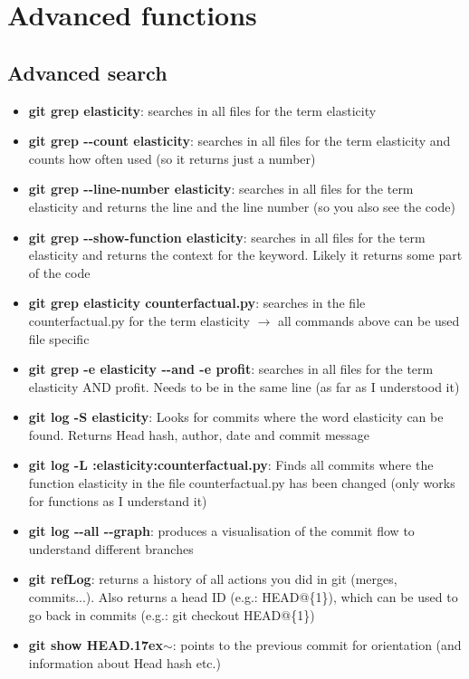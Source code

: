 \documentclass[12pt]{article}
\begin{document}
\section{Advanced functions}
\subsection{Advanced search}
\begin {itemize}
\item \textbf{git grep elasticity}: searches in all files for the term elasticity
\item \textbf{git grep \textrm{-}\textrm{-}count elasticity}: searches in all files for the term elasticity and counts how often used (so it returns just a number)
\item \textbf{git grep \textrm{-}\textrm{-}line-number elasticity}: searches in all files for the term elasticity and returns the line and the line number (so you also see the code)
\item \textbf{git grep \textrm{-}\textrm{-}show-function elasticity}: searches in all files for the term elasticity and returns the context for the keyword. Likely it returns some part of the code
\item \textbf{git grep elasticity counterfactual.py}: searches in the file counterfactual.py for the term elasticity $\rightarrow$ all commands above can be used file specific
\item \textbf{git grep -e elasticity \textrm{-}\textrm{-}and -e profit}: searches in all files for the term elasticity AND profit. Needs to be in the same line (as far as I understood it)
\item \textbf{git log -S elasticity}: Looks for commits where the word elasticity can be found. Returns  Head hash, author, date and commit message
\item \textbf{git log -L :elasticity:counterfactual.py}: Finds all commits where the function elasticity in the file counterfactual.py has been changed (only works for functions as I understand it)
\item \textbf{git log \textrm{-}\textrm{-}all \textrm{-}\textrm{-}graph}: produces a visualisation of the commit flow to understand different branches 
\item \textbf{git refLog}: returns a history of all actions you did in git (merges, commits...). Also returns a head ID (e.g.: HEAD@\{1\}), which can be used to go back in commits (e.g.: git checkout HEAD@\{1\})
\item \textbf{git show HEAD{\raise.17ex\hbox{$\scriptstyle\mathtt{\sim}$}}}: points to the previous commit for orientation (and information about Head hash etc.) 

\end{itemize}
\end{document}
